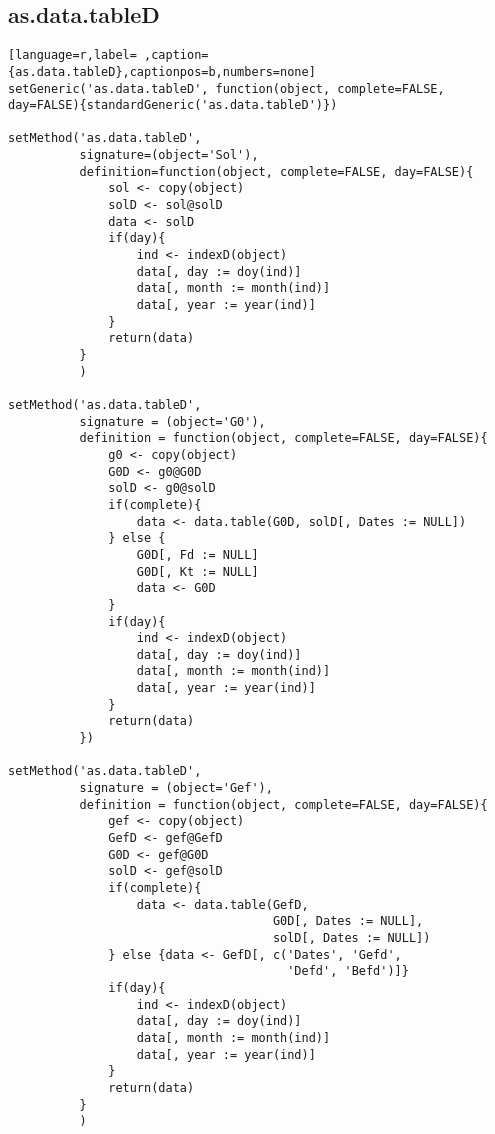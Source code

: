 \subsection{as.data.tableD}
\label{sec:orgf0dfc7c}
\label{subsec:as.data.tabled}
\begin{lstlisting}[language=r,label= ,caption={as.data.tableD},captionpos=b,numbers=none]
setGeneric('as.data.tableD', function(object, complete=FALSE, day=FALSE){standardGeneric('as.data.tableD')})

setMethod('as.data.tableD',
          signature=(object='Sol'),
          definition=function(object, complete=FALSE, day=FALSE){
              sol <- copy(object)
              solD <- sol@solD
              data <- solD
              if(day){
                  ind <- indexD(object)
                  data[, day := doy(ind)]
                  data[, month := month(ind)]
                  data[, year := year(ind)]
              }
              return(data)
          }
          )

setMethod('as.data.tableD',
          signature = (object='G0'),
          definition = function(object, complete=FALSE, day=FALSE){
              g0 <- copy(object)
              G0D <- g0@G0D
              solD <- g0@solD
              if(complete){
                  data <- data.table(G0D, solD[, Dates := NULL])
              } else {
                  G0D[, Fd := NULL]
                  G0D[, Kt := NULL]
                  data <- G0D
              }
              if(day){
                  ind <- indexD(object)
                  data[, day := doy(ind)]
                  data[, month := month(ind)]
                  data[, year := year(ind)]
              }
              return(data)
          })

setMethod('as.data.tableD',
          signature = (object='Gef'),
          definition = function(object, complete=FALSE, day=FALSE){
              gef <- copy(object)
              GefD <- gef@GefD
              G0D <- gef@G0D
              solD <- gef@solD
              if(complete){
                  data <- data.table(GefD,
                                     G0D[, Dates := NULL],
                                     solD[, Dates := NULL])
              } else {data <- GefD[, c('Dates', 'Gefd',
                                       'Defd', 'Befd')]}
              if(day){
                  ind <- indexD(object)
                  data[, day := doy(ind)]
                  data[, month := month(ind)]
                  data[, year := year(ind)]     
              }
              return(data)
          }
          )


\end{lstlisting}
